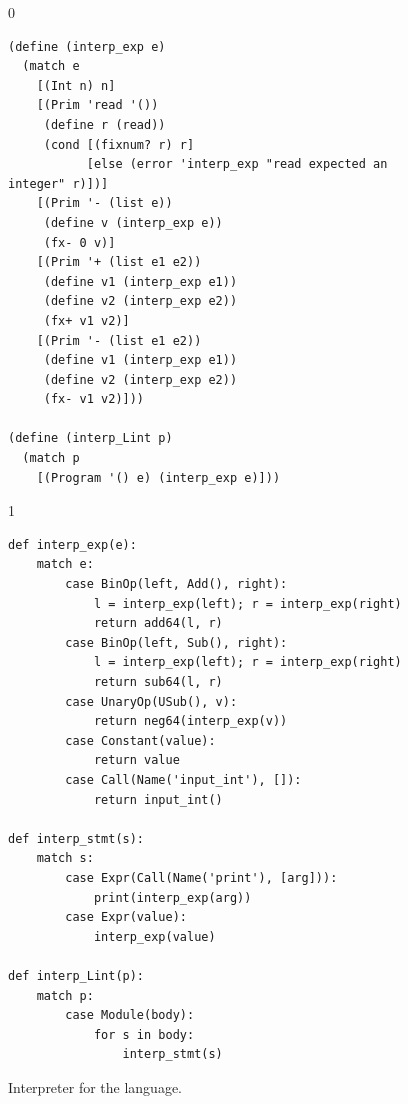 \documentclass[7x10]{TimesAPriori_MIT}%
\def\racketEd{0}
\def\pythonEd{1}
\def\edition{1}
\newcommand{\pythonColor}[0]{}
\numberwithin{theorem}{chapter}
\numberwithin{definition}{chapter}
\numberwithin{equation}{chapter}
\begin{document}
\begin{figure}[tp]
\begin{tcolorbox}[colback=white]
{\if\edition\racketEd
\begin{lstlisting}
(define (interp_exp e)
  (match e
    [(Int n) n]
    [(Prim 'read '())
     (define r (read))
     (cond [(fixnum? r) r]
           [else (error 'interp_exp "read expected an integer" r)])]
    [(Prim '- (list e))
     (define v (interp_exp e))
     (fx- 0 v)]
    [(Prim '+ (list e1 e2))
     (define v1 (interp_exp e1))
     (define v2 (interp_exp e2))
     (fx+ v1 v2)]
    [(Prim '- (list e1 e2))
     (define v1 (interp_exp e1))
     (define v2 (interp_exp e2))
     (fx- v1 v2)]))

(define (interp_Lint p)
  (match p
    [(Program '() e) (interp_exp e)]))
\end{lstlisting}
\fi}
{\if\edition\pythonEd\pythonColor
\begin{lstlisting}
def interp_exp(e):
    match e:
        case BinOp(left, Add(), right):
            l = interp_exp(left); r = interp_exp(right)
            return add64(l, r)
        case BinOp(left, Sub(), right):
            l = interp_exp(left); r = interp_exp(right)
            return sub64(l, r)
        case UnaryOp(USub(), v):
            return neg64(interp_exp(v))
        case Constant(value):
            return value
        case Call(Name('input_int'), []):
            return input_int()

def interp_stmt(s):
    match s:
        case Expr(Call(Name('print'), [arg])):
            print(interp_exp(arg))
        case Expr(value):
            interp_exp(value)

def interp_Lint(p):
    match p:
        case Module(body):
            for s in body:
                interp_stmt(s)
\end{lstlisting}
\fi}
\end{tcolorbox}

\caption{Interpreter for the \LangInt{} language.}
\label{fig:interp_Lint}
\end{figure}
\end{document}
